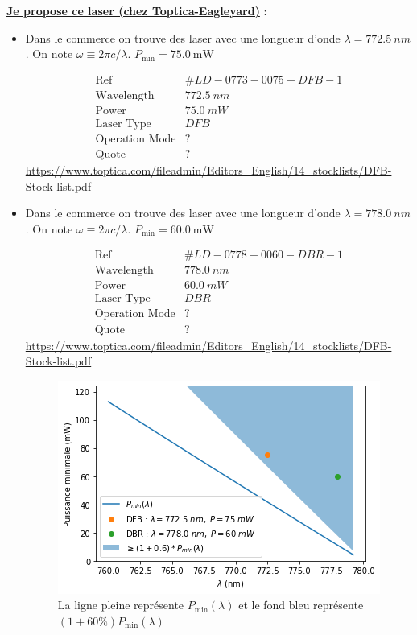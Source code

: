 {\color{red} 

\underline{\bf  Je propose ce laser (chez Toptica-Eagleyard)} :\\


 
\begin{itemize}

	\item Dans le commerce on trouve des laser avec une longueur d'onde $\lambda = 772.5~nm$. On note $\omega \equiv 2 \pi c / \lambda $. {\color{red} $P_{\text{min}} = 75.0~\text{mW}$} 

$$
\begin{array}{rl}
	\mbox{Ref} & \#LD-0773-0075-DFB-1\\
	\mbox{Wavelength} & 772.5 ~nm\\
	\mbox{Power} & 75.0~ mW\\
	\mbox{Laser Type} & DFB\\
	\mbox{Operation Mode} & ?\\
	\mbox{Quote} & ? 
\end{array}
$$
\url{https://www.toptica.com/fileadmin/Editors_English/14_stocklists/DFB-Stock-list.pdf}\\

	\item Dans le commerce on trouve des laser avec une longueur d'onde $\lambda = 778.0~nm$. On note $\omega \equiv 2 \pi c / \lambda $. {\color{red} $P_{\text{min}} = 60.0~\text{mW}$} 

$$
\begin{array}{rl}
	\mbox{Ref} & \#LD-0778-0060-DBR-1 \\
	\mbox{Wavelength} & 778.0 ~nm\\
	\mbox{Power} & 60.0~ mW\\
	\mbox{Laser Type} & DBR\\
	\mbox{Operation Mode} & ?\\
	\mbox{Quote} & ?
\end{array}
$$
\url{https://www.toptica.com/fileadmin/Editors_English/14_stocklists/DFB-Stock-list.pdf}\\


\begin{figure}
    \centering
    \includegraphics[width=0.7\linewidth]{Dipolaire/Figures/Power_min_lambda}
    \caption{La ligne pleine représente $P_{\text{min}}(\lambda)$ et le fond bleu représente $(1 + 60\% ) P_{\text{min}}(\lambda)$}
\end{figure}


\end{itemize}}
